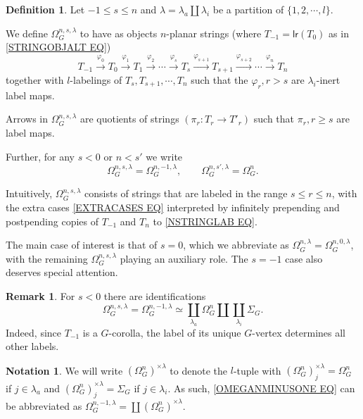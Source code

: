 \documentclass[a4paper,10pt
,draft
]{article}%
\numberwithin{equation}{section}
\numberwithin{figure}{section}
\theoremstyle{definition} %
\newtheorem{definition}[equation]{Definition}%
\newtheorem{remark}[equation]{Remark}%
\newtheorem{notation}[equation]{Notation}%
\newcommand{\1}{\ensuremath{\mathbbm 1}}%
\begin{document}
\begin{definition}
Let $-1 \leq s \leq n$ and 
$\lambda = \lambda_a \amalg \lambda_i$ 
be a partition of $\{1,2,\cdots,l\}$.

We define $\Omega_{G}^{n,s,\lambda}$ to have as objects $n$-planar strings (where $T_{-1} = \mathsf{lr}(T_0)$ as in \eqref{STRINGOBJALT EQ})
\begin{equation}\label{NSTRINGLAB EQ}
	T_{-1} \xrightarrow{\varphi_0}
	T_0 \xrightarrow{\varphi_1}
	T_1 \xrightarrow{\varphi_2}
	\cdots \xrightarrow{\varphi_s}
	T_s \xrightarrow{\varphi_{s+1}}
	T_{s+1} \xrightarrow{\varphi_{s+2}}
	\cdots \xrightarrow{\varphi_n}
	T_{n}
\end{equation}
together with
$l$-labelings of $T_s, T_{s+1},\cdots, T_{n}$ such that the $\varphi_r,r>s$ are $\lambda_i$-inert label maps.

Arrows in $\Omega_{G}^{n,s,\lambda}$ are quotients of strings
$(\pi_r \colon T_r \to T'_r)$ such that 
$\pi_r, r\geq s$ are label maps.

Further, for any $s<0$ or $n<s'$ we write
\begin{equation}\label{EXTRACASES EQ}
	\Omega_{G}^{n,s,\lambda} = 
		\Omega_{G}^{n,-1,\lambda},
\qquad
	\Omega_{G}^{n,s',\lambda} = \Omega_{G}^{n}.
\end{equation}
\end{definition}

Intuitively, $\Omega_G^{n,s,\lambda}$ consists of strings that are labeled in the range $s \leq r \leq n$,
with the extra cases \eqref{EXTRACASES EQ} interpreted by infinitely prepending and postpending copies of $T_{-1}$ and $T_n$ to \eqref{NSTRINGLAB EQ}.

The main case of interest is that of $s=0$, which we abbreviate as $\Omega_{G}^{n,\lambda} = \Omega_{G}^{n,0,\lambda}$,
with the remaining
$\Omega_{G}^{n,s,\lambda}$ playing an auxiliary role.
The $s=-1$ case also deserves special attention.

\begin{remark}
	For $s<0$ there are identifications 
\begin{equation}\label{OMEGANMINUSONE EQ}
	\Omega_{G}^{n,s,\lambda} = 
	\Omega_{G}^{n,-1,\lambda} \simeq
		\coprod_{\lambda_a} \Omega_{G}^{n} \amalg
		\coprod_{\lambda_i} \Sigma_G.
\end{equation}
Indeed, since $T_{-1}$ is a $G$-corolla, the label of its unique $G$-vertex determines all other labels.
\end{remark}

\begin{notation}
We will write $(\Omega_G^n)^{\times \lambda}$ to denote the $l$-tuple with 
$(\Omega_G^n)^{\times \lambda}_j = \Omega_G^n$ if 
$j \in \lambda_a$ and
$(\Omega_G^n)^{\times \lambda}_j = \Sigma_G$ if
$j \in \lambda_i$.
As such, \eqref{OMEGANMINUSONE EQ} can be abbreviated as
$\Omega_{G}^{n,-1,\lambda} = \coprod (\Omega_G^n)^{\times \lambda}$.
\end{notation}
\end{document}
